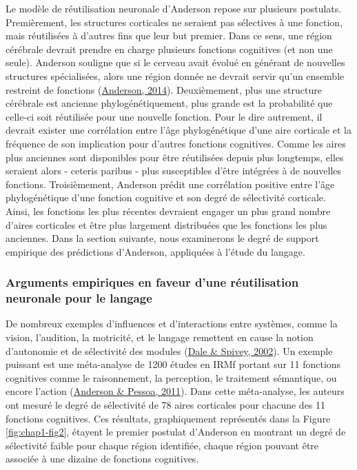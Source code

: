 \documentclass[
  a4paper,12pt,twoside,onecolumn,openright,final,oldfontcommands]{memoir}
\begin{document}
Le modèle de réutilisation neuronale d'Anderson repose sur plusieurs postulats. Premièrement, les structures corticales ne seraient pas sélectives à une fonction, mais réutilisées à d'autres fins que leur but premier. Dans ce sens, une région cérébrale devrait prendre en charge plusieurs fonctions cognitives (et non une seule). Anderson souligne que si le cerveau avait évolué en générant de nouvelles structures spécialisées, alors une région donnée ne devrait servir qu'un ensemble restreint de fonctions (\protect\hyperlink{ref-anderson_after_2014}{Anderson, 2014}). Deuxièmement, plus une structure cérébrale est ancienne phylogénétiquement, plus grande est la probabilité que celle-ci soit réutilisée pour une nouvelle fonction. Pour le dire autrement, il devrait exister une corrélation entre l'âge phylogénétique d'une aire corticale et la fréquence de son implication pour d'autres fonctions cognitives. Comme les aires plus anciennes sont disponibles pour être réutilisées depuis plus longtemps, elles seraient alors - ceteris paribus - plus susceptibles d'être intégrées à de nouvelles fonctions. Troisièmement, Anderson prédit une corrélation positive entre l'âge phylogénétique d'une fonction cognitive et son degré de sélectivité corticale. Ainsi, les fonctions les plus récentes devraient engager un plus grand nombre d'aires corticales et être plus largement distribuées que les fonctions les plus anciennes. Dans la section suivante, nous examinerons le degré de support empirique des prédictions d'Anderson, appliquées à l'étude du langage.

\hypertarget{arguments-empiriques-en-faveur-dune-ruxe9utilisation-neuronale-pour-le-langage}{%
\subsubsection{Arguments empiriques en faveur d'une réutilisation neuronale pour le langage}\label{arguments-empiriques-en-faveur-dune-ruxe9utilisation-neuronale-pour-le-langage}}

De nombreux exemples d'influences et d'interactions entre systèmes, comme la vision, l'audition, la motricité, et le langage remettent en cause la notion d'autonomie et de sélectivité des modules (\protect\hyperlink{ref-dale_linguistic_2002}{Dale \& Spivey, 2002}). Un exemple puissant est une méta-analyse de 1200 études en IRMf portant sur 11 fonctions cognitives comme le raisonnement, la perception, le traitement sémantique, ou encore l'action (\protect\hyperlink{ref-anderson_quantifying_2011}{Anderson \& Pessoa, 2011}). Dans cette méta-analyse, les auteurs ont mesuré le degré de sélectivité de 78 aires corticales pour chacune des 11 fonctions cognitives. Ces résultats, graphiquement représentés dans la Figure \ref{fig:chap1-fig2}, étayent le premier postulat d'Anderson en montrant un degré de sélectivité faible pour chaque région identifiée, chaque région pouvant être associée à une dizaine de fonctions cognitives.
\end{document}

